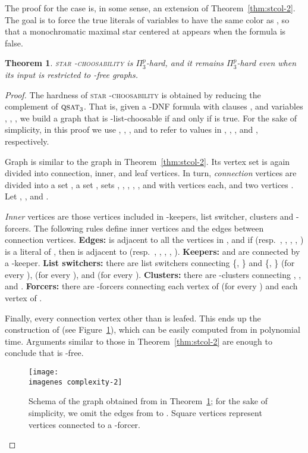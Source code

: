 \documentclass[a4paper, 11pt, oneside]{article}
\newtheorem{theorem}{Theorem}
\newcommand{\stchose}[1]{\textsc{star -choosability}}
\newcommand{\ptp}{\ensuremath{\Pi^p_3}\xspace}
\newcommand{\qsat}[1]{\ensuremath{\textsc{qsat}_{#1}}}
\def\imagenes{}
\begin{document}
The proof for the case  is, in some sense, an extension of Theorem~\ref{thm:stcol-2}.  The goal is to force the true literals of  variables to have the same color as , so that a monochromatic maximal star centered at  appears when the formula is false.  

\begin{theorem}\label{thm:stchose-2}
 \stchose{2} is \ptp-hard, and it remains \ptp-hard even when its input is restricted to -free graphs.
\end{theorem}

\begin{proof}
  The hardness of \stchose{2} is obtained by reducing the complement of \qsat{3}.  That is, given a -DNF formula  with  clauses , and  variables , , , we build a graph  that is -list-choosable if and only if  is true.  For the sake of simplicity, in this proof we use , , , and  to refer to values in , , , and , respectively.  
  
  Graph  is similar to the graph in Theorem~\ref{thm:stcol-2}.  Its vertex set is again divided into connection, inner, and leaf vertices. In turn, \emph{connection} vertices are divided into a set , a set , sets , , , , , and  with  vertices each, and two vertices .  Let , , and .
  
  \emph{Inner} vertices are those vertices included in -keepers, list switcher, clusters and -forcers.  The following rules define inner vertices and the edges between connection vertices.  \textbf{Edges:}  is adjacent to all the vertices in , and if  (resp.\ , , , , ) is a literal of , then  is adjacent to  (resp.\ , , , , ).  \textbf{Keepers:}  and  are connected by a -keeper.  \textbf{List switchers:}  there are list switchers connecting \{, \} and \{, \} (for every ),  (for every ), and  (for every ).  \textbf{Clusters:}  there are -clusters connecting , , and . \textbf{Forcers:} there are -forcers connecting each vertex of  (for every ) and each vertex of .

  Finally, every connection vertex other than  is leafed.  This ends up the construction of  (see Figure~\ref{fig:choosing}), which can be easily computed from  in polynomial time.   Arguments similar to those in Theorem~\ref{thm:stcol-2} are enough to conclude that  is -free.  

\begin{figure}
  \centering
  \texttt{[image: \\imagenes complexity-2]}
  \caption{Schema of the graph obtained from  in Theorem~\ref{thm:stchose-2}; for the sake of simplicity, we omit the edges from  to .  Square vertices represent vertices connected to a -forcer.}\label{fig:choosing}
\end{figure}


\end{proof}
\end{document}

